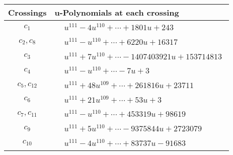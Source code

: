 \documentclass[1p]{elsarticle_modified}
\theoremstyle{definition}
\begin{document}
\begin{tabular}{m{50pt}|m{274pt}}
Crossings & \hspace{64pt}u-Polynomials at each crossing \\
\hline $$\begin{aligned}c_{1}\end{aligned}$$&$\begin{aligned}
&u^{111}-4 u^{110}+\cdots+1801 u+243
\end{aligned}$\\
\hline $$\begin{aligned}c_{2},c_{8}\end{aligned}$$&$\begin{aligned}
&u^{111}- u^{110}+\cdots+6220 u+16317
\end{aligned}$\\
\hline $$\begin{aligned}c_{3}\end{aligned}$$&$\begin{aligned}
&u^{111}+7 u^{110}+\cdots-1407403921 u+153714813
\end{aligned}$\\
\hline $$\begin{aligned}c_{4}\end{aligned}$$&$\begin{aligned}
&u^{111}- u^{110}+\cdots-7 u+3
\end{aligned}$\\
\hline $$\begin{aligned}c_{5},c_{12}\end{aligned}$$&$\begin{aligned}
&u^{111}+48 u^{109}+\cdots+261816 u+23711
\end{aligned}$\\
\hline $$\begin{aligned}c_{6}\end{aligned}$$&$\begin{aligned}
&u^{111}+21 u^{109}+\cdots+53 u+3
\end{aligned}$\\
\hline $$\begin{aligned}c_{7},c_{11}\end{aligned}$$&$\begin{aligned}
&u^{111}- u^{110}+\cdots+453319 u+98619
\end{aligned}$\\
\hline $$\begin{aligned}c_{9}\end{aligned}$$&$\begin{aligned}
&u^{111}+5 u^{110}+\cdots-9375844 u+2723079
\end{aligned}$\\
\hline $$\begin{aligned}c_{10}\end{aligned}$$&$\begin{aligned}
&u^{111}-4 u^{110}+\cdots+83737 u-91683
\end{aligned}$\\
\hline
\end{tabular}\\~\\
\end{document}
